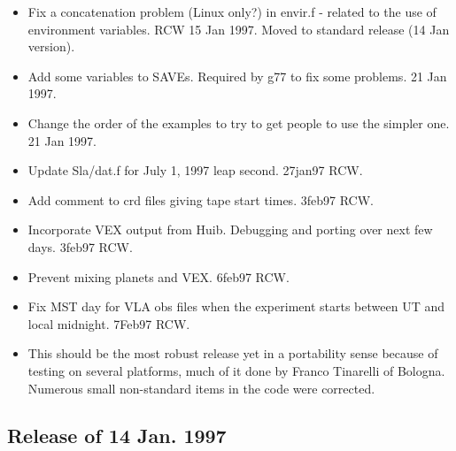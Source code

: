 \documentclass{report}
\begin{document}
\begin{itemize}

\item Fix a concatenation problem (Linux only?) in envir.f - related
      to the use of environment variables.  RCW  15 Jan 1997.
      Moved to standard release (14 Jan version).

\item Add some variables to SAVEs.  Required by g77 to fix some
      problems.  21 Jan 1997.

\item Change the order of the examples to try to get people to  use
      the simpler one.  21 Jan 1997.

\item Update Sla/dat.f for July 1, 1997 leap second.  27jan97 RCW.

\item Add comment to crd files giving tape start times. 3feb97 RCW.

\item Incorporate VEX output from Huib.  Debugging and porting
      over next few days.  3feb97 RCW.

\item Prevent mixing planets and VEX.  6feb97 RCW.

\item Fix MST day for VLA obs files when the experiment starts between
      UT and local midnight.  7Feb97 RCW.

\item This should be the most robust release yet in a portability
      sense because of testing on several platforms, much of it
      done by Franco Tinarelli of Bologna.  Numerous small
      non-standard items in the code were corrected.

\end{itemize}

\subsection{\label{SSSEC:JAN97}Release of 14 Jan. 1997}
\end{document}

